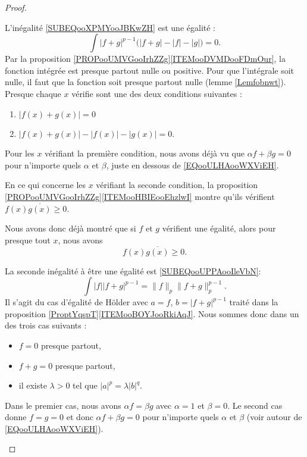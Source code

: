 \begin{proof}
\begin{subproof}
		L'inégalité \eqref{SUBEQooXPMYooJBKwZH} est une égalité :
		\begin{equation}
			\int | f+g |^{p-1}\big( | f+g |-| f |-| g | \big)=0.
		\end{equation}
		Par la proposition \ref{PROPooUMVGooIrhZZg}\ref{ITEMooDVMDooFDmOur}, la fonction intégrée est presque partout nulle ou positive. Pour que l'intégrale soit nulle, il faut que la fonction soit presque partout nulle (lemme \ref{Lemfobnwt}). Presque chaque \( x\) vérifie sont une des deux conditions suivantes :
		\begin{enumerate}
			\item
			      \( | f(x)+g(x) |=0\)
			\item
			      \( | f(x)+g(x) |-| f(x) |-| g(x) |=0\).
		\end{enumerate}
		Pour les \( x\) vérifiant la première condition, nous avons déjà vu que \( \alpha f+\beta g=0\) pour n'importe quels \( \alpha\) et \( \beta\), juste en dessous de \eqref{EQooULHAooWXViEH}.

		En ce qui concerne les \( x\) vérifiant la seconde condition, la proposition \ref{PROPooUMVGooIrhZZg}\ref{ITEMooHBIEooEhzlwI} montre qu'ils vérifient \( f(x)\overline{g(x)}\geq 0\).

		Nous avons donc déjà montré que si \( f\) et \( g\) vérifient une égalité, alors pour presque tout \( x\), nous avons
		\begin{equation}
			f(x)\overline{g(x)}\geq 0.
		\end{equation}


		La seconde inégalité à être une égalité est \eqref{SUBEQooUPPAooIleVbN}:
		\begin{equation}
			\int | f || f+g |^{p-1}=\| f \|_p\| f+g \|_p^{p-1}.
		\end{equation}
		Il s'agit du cas d'égalité de Hölder avec \( a=f\), \( b=| f+g |^{p-1}\) traité dans la proposition \ref{ProptYqspT}\ref{ITEMooBOYJooRkiAqJ}. Nous sommes donc dans un des trois cas suivants :
		\begin{itemize}
			\item \( f=0\) presque partout,
			\item \( f+g=0\) presque partout,
			\item il existe \( \lambda>0\) tel que \( | a |^p=\lambda | b |^q\).
		\end{itemize}
		Dans le premier cas, nous avons \( \alpha f=\beta g\) avec \( \alpha=1\) et \( \beta=0\). Le second cas donne \( f=g=0\) et donc \( \alpha f+\beta g=0\) pour n'importe quels \( \alpha\) et \( \beta\) (voir autour de \eqref{EQooULHAooWXViEH}).


\end{subproof}
\end{proof}
